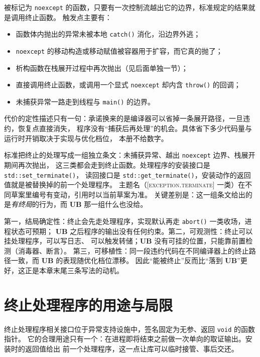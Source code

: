 \documentclass[12pt,a4paper,fontset=fandol]{ctexbook}
\newcommand{\Fn}[1]{\texttt{#1()}}
\newcommand{\Tp}[1]{\texttt{#1}}
\newcommand{\Bk}{\discretionary{}{}{}}
\newcommand{\UB}{\textbf{\textsf{UB}}}
\newcommand{\Std}[1]{\textsc{[#1]}}
\begin{document}
被标记为 \Tp{noexcept} 的函数，只要有一次控制流越出它的边界，标准规定的结果就是调用终止函数。
触发点主要有：

\begin{itemize}
  \item 函数体内抛出的异常未被本地 \Fn{catch} 消化，沿边界外逃；
  \item \Tp{noexcept} 的移动构造或移动赋值被容器用于扩容，而它真的抛了；
  \item 析构函数在栈展开过程中再次抛出（见后面单独一节）；
  \item 直接调用终止函数，或调用一个显式 \Tp{noexcept} 却内含 \Fn{throw} 的回调；
  \item 未捕获异常一路走到线程与 \Fn{main} 的边界。
\end{itemize}

代价的定性描述只有一句：承诺换来的是编译器可以省掉一条展开路径，一旦违约，恢复点直接消失，
程序没有“捕获后再处理”的机会。具体省下多少代码量与运行时开销取决于实现与优化档位，
本册不给数字。

\begin{clause}[title={终止与未定义行为的两套规则}]
标准把终止的处理写成一组独立条文：未捕获异常、越出 \Tp{noexcept} 边界、栈展开期间再次抛出，
这三类都会走到终止函数。处理程序的安装接口是 \Fn{std::set{\Bk}\_terminate}，
读回接口是 \Fn{std::get{\Bk}\_terminate}，安装动作的返回值就是被替换掉的前一个处理程序。
主题名（\Std{exception.terminate} 一类）在不同草案里编号有变动，引用时以当前草案为准。
关键差别是：这一组条文给出的是\emph{有终局}的行为，而 \UB{} 那一组什么也没给。
\end{clause}

\begin{compare}[title={terminate 与 \UB{} 的三点差别}]
第一，结局确定性：终止会先走处理程序，实现默认再走 \Fn{abort} 一类收场，进程状态可预期；
\UB{} 之后程序的输出没有任何约束。第二，可观测性：终止可以挂处理程序，可以写日志、
可以触发转储；\UB{} 没有可挂的位置，只能靠前置检测（消毒器、断言）。
第三，可移植性：同一段违约代码在不同编译器上的终止路径一致，而 \UB{} 的表现随优化档位漂移。
因此“能被终止”反而比“落到 \UB{}”更好，这正是本章末尾三条写法的动机。
\end{compare}

\section{终止处理程序的用途与局限}\label{sec:ub11-terminate-handler}

终止处理程序相关接口位于异常支持设施中，签名固定为无参、返回 \Tp{void} 的函数指针。
它的合理用途只有一个：在进程即将结束之前做一次单向的取证输出。安装时的返回值给出
前一个处理程序，这一点让库可以临时接管、事后交还。
\end{document}
